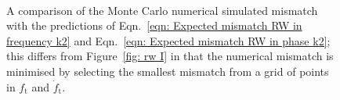 \documentclass[../full_thesis/full_thesis.tex]{subfiles}
\begin{document}
\begin{figure}[ht]
\centering
{}
\\
\caption{A comparison of the Monte Carlo numerical simulated mismatch with the
predictions of Eqn.~\eqref{eqn: Expected mismatch RW in
frequency k2} and Eqn.~\eqref{eqn: Expected mismatch RW in phase k2}; this differs
from Figure~\ref{fig: rw I} in that the numerical mismatch is minimised by selecting
the smallest mismatch from a grid of points in $f_\textrm{t}$ and $\dot{f}_\textrm{t}$.}
\label{fig: verification of minimised RW}
\end{figure}
\end{document}
